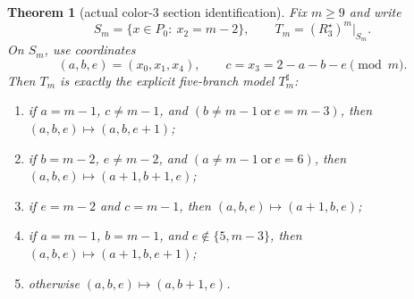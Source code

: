 \documentclass[11pt]{article}
\newtheorem{theorem}{Theorem}[section]
\newcommand{\Pzero}{P_0}
\newcommand{\Ssec}{S_m}
\newcommand{\Tsharp}{T_m^{\sharp}}
\begin{document}
\begin{theorem}[actual color-$3$ section identification]
\label{thm:M5-color3-ident}
Fix \(m\ge 9\) and write
\[
\Ssec=\{x\in\Pzero:\ x_2=m-2\},
\qquad
T_m=(R_3^\star)^m\vert_{\Ssec}.
\]
On \(\Ssec\), use coordinates
\[
(a,b,e)=(x_0,x_1,x_4),
\qquad
c=x_3=2-a-b-e \pmod m.
\]
Then \(T_m\) is exactly the explicit five-branch model \(\Tsharp\):
\begin{enumerate}[label=\textup{(\arabic*)},leftmargin=2.8em]
\item if \(a=m-1\), \(c\neq m-1\), and \((b\neq m-1\ \text{or}\ e=m-3)\), then
      \((a,b,e)\mapsto(a,b,e+1)\);
\item if \(b=m-2\), \(e\neq m-2\), and \((a\neq m-1\ \text{or}\ e=6)\), then
      \((a,b,e)\mapsto(a+1,b+1,e)\);
\item if \(e=m-2\) and \(c=m-1\), then
      \((a,b,e)\mapsto(a+1,b,e)\);
\item if \(a=m-1\), \(b=m-1\), and \(e\notin\{5,m-3\}\), then
      \((a,b,e)\mapsto(a+1,b,e+1)\);
\item otherwise
      \((a,b,e)\mapsto(a,b+1,e)\).
\end{enumerate}
\end{theorem}
\end{document}
